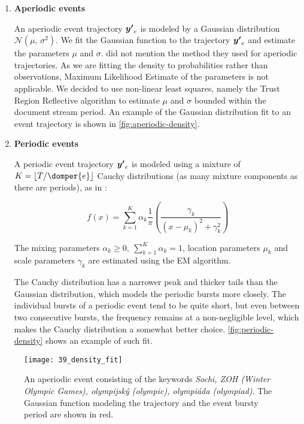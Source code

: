 \begin{enumerate}

\item \textbf{Aperiodic events}

An aperiodic event trajectory $\vect{\trajn}_{e}$ is modeled by a Gaussian distribution $\mathcal{N}(\mu,\,\sigma^{2})$. We fit the Gaussian function to the trajectory $\vect{\trajn}_{e}$ and estimate the parameters $\mu$ and $\sigma$. \cite{event-detection} did not mention the method they used for aperiodic trajectories. As we are fitting the density to probabilities rather than observations, Maximum Likelihood Estimate of the parameters is not applicable. We decided to use non-linear least squares, namely the Trust Region Reflective algorithm \citep{trust-region-reflective} to estimate $\mu$ and $\sigma$ bounded within the document stream period. An example of the Gaussian distribution fit to an event trajectory is shown in \autoref{fig:aperiodic-density}.

\item \textbf{Periodic events}

A periodic event trajectory $\vect{\trajn}_{e}$ is modeled using a mixture of $K = \floor{\streamlen / \domper{e}}$ Cauchy distributions (as many mixture components as there are periods), as in \cite{health-events}:

\begin{equation*}
	f(x) = \sum_{k = 1}^{K}{\alpha_{k} \frac{1}{\pi} \left( \frac{\gamma_{k}}{\left( x - \mu_{k} \right)^{2} + \gamma_{k}^{2}} \right)}
\end{equation*}

The mixing parameters $\alpha_{k} \geq 0,\ \sum_{k = 1}^{K}{\alpha_{k}} = 1$, location parameters $\mu_{k}$ and scale parameters $\gamma_{k}$ are estimated using the EM algorithm.

The Cauchy distribution has a narrower peak and thicker tails than the Gaussian distribution, which models the periodic bursts more closely. The individual bursts of a periodic event tend to be quite short, but even between two consecutive bursts, the frequency remains at a non-negligible level, which makes the Cauchy distribution a somewhat better choice. \autoref{fig:periodic-density} shows an example of such fit.

\end{enumerate}

\begin{figure}
  \centering
  \texttt{[image: 39\_density\_fit]}  %
  \caption{An aperiodic event consisting of the keywords \textit{Sochi, ZOH (Winter Olympic Games), olympijský (olympic), olympiáda (olympiad)}. The Gaussian function modeling the trajectory and the event bursty period are shown in red.}
  \label{fig:aperiodic-density}
\end{figure}


